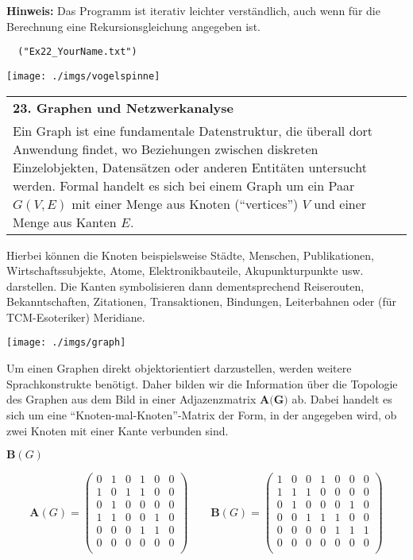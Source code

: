\documentclass[paper=A4, pagesize, DIV=calc, smallheadings,
fontsize=11pt, expansion=false]{scrreprt}
\begin{document}
\textbf{Hinweis:} Das Programm ist iterativ leichter verständlich, auch wenn für die Berechnung eine Rekursionsgleichung angegeben ist.
\begin{verbatim}
  ("Ex22_YourName.txt")
\end{verbatim} 


\begin{minipage}[H]{0.3\linewidth}
\texttt{[image: ./imgs/vogelspinne]}
\end{minipage}
\begin{tabular}{m{30em}}\textbf
{23. Graphen und Netzwerkanalyse}\\
Ein Graph ist eine fundamentale Datenstruktur, die überall dort Anwendung findet, wo 
 Beziehungen zwischen diskreten Einzelobjekten, Datensätzen oder anderen Entitäten untersucht werden.
 Formal handelt es sich bei einem Graph um ein Paar $G(V, E)$ mit einer Menge aus Knoten (``vertices'') $V$ und einer Menge aus Kanten $E$.\end{tabular}
Hierbei können die Knoten beispielsweise Städte, Menschen, Publikationen, Wirtschaftssubjekte, Atome, Elektronikbauteile, Akupunkturpunkte usw. darstellen. Die Kanten symbolisieren dann dementsprechend Reiserouten, Bekanntschaften, Zitationen, Transaktionen, Bindungen, Leiterbahnen oder
(für TCM-Esoteriker) Meridiane.\\
\begin{center}
\texttt{[image: ./imgs/graph]} 
\end{center}
Um einen Graphen direkt objektorientiert darzustellen, werden weitere Sprachkonstrukte benötigt. 
Daher bilden wir die Information über die Topologie des Graphen aus dem Bild in einer Adjazenzmatrix $\textbf{A(G)}$ ab. Dabei handelt es sich um eine ``Knoten-mal-Knoten''-Matrix der Form, in der angegeben wird, ob zwei Knoten mit einer Kante verbunden sind.

$\textbf{B}(G)$

\hspace{4em}
\[ \mathbf{A}(G) = \left( \begin{array}{ccccccc}
0 & 1 & 0 & 1 & 0 & 0 \\
1 & 0 & 1 & 1 & 0 & 0 \\
0 & 1 & 0 & 0 & 0 & 0 \\
1 & 1 & 0 & 0 & 1 & 0 \\
0 & 0 & 0 & 1 & 1 & 0 \\
0 & 0 & 0 & 0 & 0 & 0 \\
    \end{array} \right) \qquad
\mathbf{B}(G) =  \left( \begin{array}{cccccccc}
1 & 0 & 0 & 1 & 0 & 0 & 0 \\
1 & 1 & 1 & 0 & 0 & 0 & 0 \\  
0 & 1 & 0 & 0 & 0 & 1 & 0 \\   
0 & 0 & 1 & 1 & 1 & 0 & 0 \\
0 & 0 & 0 & 0 & 1 & 1 & 1 \\
0 & 0 & 0 & 0 & 0 & 0 & 0 \\
\end{array}
\right)
\]
\end{document}
